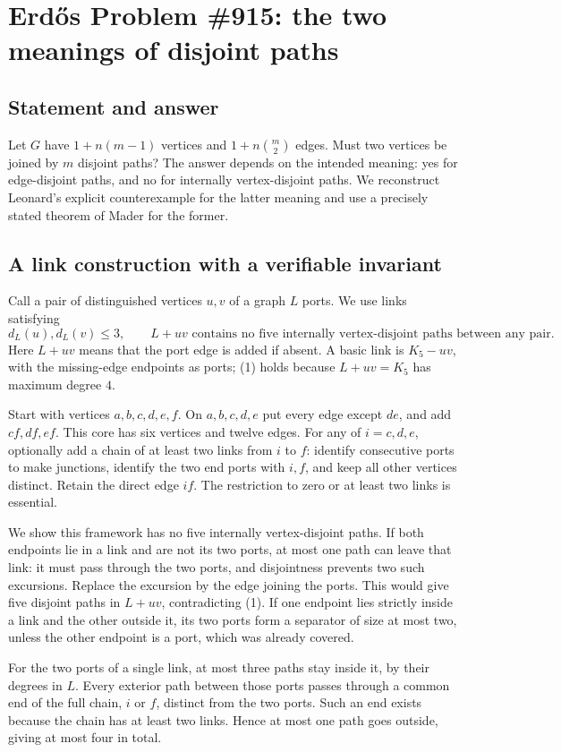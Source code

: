 \section*{Erd\H{o}s Problem \#915: the two meanings of disjoint paths}
\subsection*{Statement and answer}
Let \(G\) have \(1+n(m-1)\) vertices and \(1+n\binom m2\) edges. Must two vertices be joined by \(m\) disjoint paths?
The answer depends on the intended meaning: yes for edge-disjoint paths, and no for internally vertex-disjoint paths. We reconstruct Leonard's explicit counterexample for the latter meaning and use a precisely stated theorem of Mader for the former.

\subsection*{A link construction with a verifiable invariant}
Call a pair of distinguished vertices \(u,v\) of a graph \(L\) ports. We use links satisfying
\[
 d_L(u),d_L(v)\leq3,\qquad
 L+uv\text{ contains no five internally vertex-disjoint paths between any pair}. \tag{1}
\]
Here \(L+uv\) means that the port edge is added if absent.
A basic link is \(K_5-uv\), with the missing-edge endpoints as ports; (1) holds because \(L+uv=K_5\) has maximum degree \(4\).

Start with vertices \(a,b,c,d,e,f\). On \(a,b,c,d,e\) put every edge except \(de\), and add \(cf,df,ef\). This core has six vertices and twelve edges.
For any of \(i=c,d,e\), optionally add a chain of at least two links from \(i\) to \(f\): identify consecutive ports to make junctions, identify the two end ports with \(i,f\), and keep all other vertices distinct. Retain the direct edge \(if\).
The restriction to zero or at least two links is essential.

We show this framework has no five internally vertex-disjoint paths.
If both endpoints lie in a link and are not its two ports, at most one path can leave that link: it must pass through the two ports, and disjointness prevents two such excursions. Replace the excursion by the edge joining the ports. This would give five disjoint paths in \(L+uv\), contradicting (1).
If one endpoint lies strictly inside a link and the other outside it, its two ports form a separator of size at most two, unless the other endpoint is a port, which was already covered.

For the two ports of a single link, at most three paths stay inside it, by their degrees in \(L\).
Every exterior path between those ports passes through a common end of the full chain, \(i\) or \(f\), distinct from the two ports. Such an end exists because the chain has at least two links. Hence at most one path goes outside, giving at most four in total.

